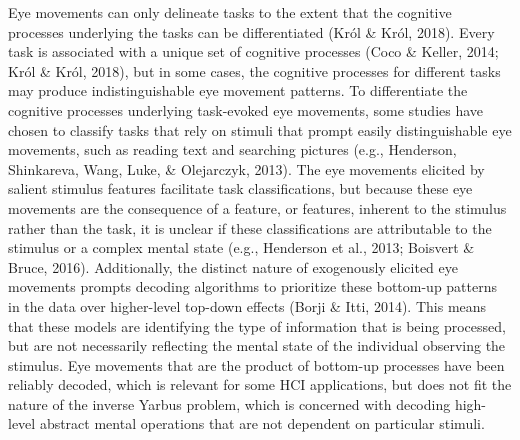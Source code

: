 \documentclass[
  english,
  man,floatsintext]{apa6}
\begin{document}
Eye movements can only delineate tasks to the extent that the cognitive processes underlying the tasks can be differentiated (Król \& Król, 2018). Every task is associated with a unique set of cognitive processes (Coco \& Keller, 2014; Król \& Król, 2018), but in some cases, the cognitive processes for different tasks may produce indistinguishable eye movement patterns. To differentiate the cognitive processes underlying task-evoked eye movements, some studies have chosen to classify tasks that rely on stimuli that prompt easily distinguishable eye movements, such as reading text and searching pictures (e.g., Henderson, Shinkareva, Wang, Luke, \& Olejarczyk, 2013). The eye movements elicited by salient stimulus features facilitate task classifications, but because these eye movements are the consequence of a feature, or features, inherent to the stimulus rather than the task, it is unclear if these classifications are attributable to the stimulus or a complex mental state (e.g., Henderson et al., 2013; Boisvert \& Bruce, 2016). Additionally, the distinct nature of exogenously elicited eye movements prompts decoding algorithms to prioritize these bottom-up patterns in the data over higher-level top-down effects (Borji \& Itti, 2014). This means that these models are identifying the type of information that is being processed, but are not necessarily reflecting the mental state of the individual observing the stimulus. Eye movements that are the product of bottom-up processes have been reliably decoded, which is relevant for some HCI applications, but does not fit the nature of the inverse Yarbus problem, which is concerned with decoding high-level abstract mental operations that are not dependent on particular stimuli.
\end{document}
